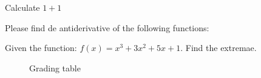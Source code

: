 \documentclass[a4paper,english,addpoints,mimicwordtwentyten]{tisdexam}
\begin{document}
\makecoverpage


\begin{questions}

\question[10]
Calculate $1+1$

\question
Please find de antiderivative of the following functions:

\question[20]
Given the function: $\displaystyle f(x) = x^3 + 3x^2 + 5x + 1$. Find the extremae.

\vspace*{1cm}

\hrulefill

\begin{figure}[!ht]
\centering
Grading table\vskip10pt

\gradetable[h]
\end{figure}

\end{questions}
\end{document}
